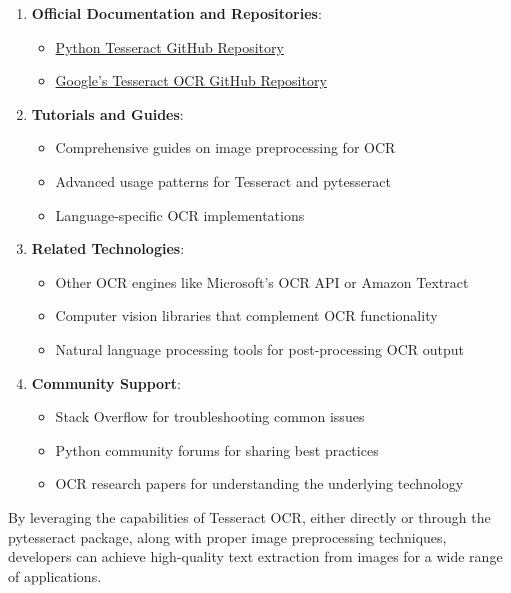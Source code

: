 \begin{enumerate}
	\item \textbf{Official Documentation and Repositories}:
	\begin{itemize}
		\item \href{https://github.com/madmaze/pytesseract}{Python Tesseract GitHub Repository}
		\item \href{https://github.com/tesseract-ocr/tesseract}{Google's Tesseract OCR GitHub Repository}
	\end{itemize}
	
	\item \textbf{Tutorials and Guides}:
	\begin{itemize}
		\item Comprehensive guides on image preprocessing for OCR
		\item Advanced usage patterns for Tesseract and pytesseract
		\item Language-specific OCR implementations
	\end{itemize}
	
	\item \textbf{Related Technologies}:
	\begin{itemize}
		\item Other OCR engines like Microsoft's OCR API or Amazon Textract
		\item Computer vision libraries that complement OCR functionality
		\item Natural language processing tools for post-processing OCR output
	\end{itemize}
	
	\item \textbf{Community Support}:
	\begin{itemize}
		\item Stack Overflow for troubleshooting common issues \cite {Reddit:2023}
		\item Python community forums for sharing best practices
		\item OCR research papers for understanding the underlying technology \cite {DataCamp:2024, Betterpath:2023, Nutrient:2025, GeekyAnts:2023}
	\end{itemize}
\end{enumerate}

By leveraging the capabilities of Tesseract OCR, either directly or through the pytesseract package, along with proper image preprocessing techniques, developers can achieve high-quality text extraction from images for a wide range of applications.

